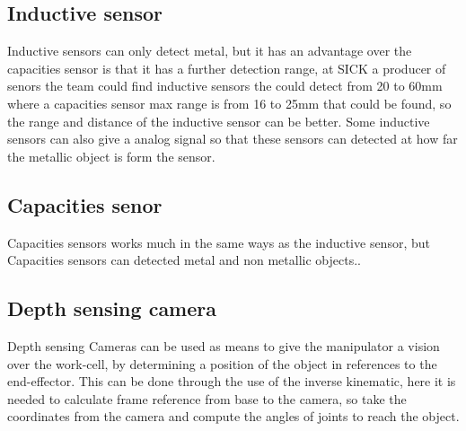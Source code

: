  \subsection{Inductive sensor}
 Inductive sensors can only detect metal, but it has an advantage over the capacities sensor is that it has a further detection range, at SICK a producer of senors the team could find inductive sensors the could detect from 20 to 60mm \cite{SICKin} where a capacities sensor max range is from 16 to 25mm \cite{SICKka} that could be found, so the range and distance of the inductive sensor can be better. Some inductive sensors can also give a analog signal so that these sensors can detected at how far the metallic object is form the sensor\cite{SICKin}.\\

 \subsection{Capacities senor} 
 Capacities sensors works much in the same ways as the inductive sensor, but Capacities sensors can detected metal and non metallic objects.\cite{SICKka}.\\

 \subsection{Depth sensing camera}
 Depth sensing Cameras can be used as means to give the manipulator a vision over the work-cell, by determining a position of the object in references to the end-effector\cite{cam}. This can be done through the use of the inverse kinematic, here it is needed to calculate frame reference from base to the camera, so take the coordinates from the camera and compute the angles of joints to reach the object\cite{JohnC}.\\
 
 
 


